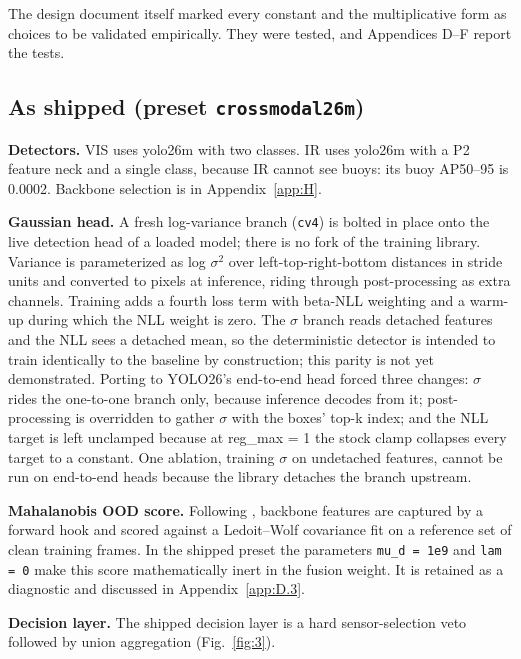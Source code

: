 \documentclass[journal,onecolumn]{IEEEtran}
\begin{document}
The design document itself marked every constant and the multiplicative form as choices to be validated empirically. They were tested, and Appendices D--F report the tests.

\subsection{As shipped (preset \texttt{crossmodal26m})}\label{app:D.2}
\textbf{Detectors.} VIS uses yolo26m \cite{jocher2026ultralytics} with two classes. IR uses yolo26m with a P2 feature neck and a single class, because IR cannot see buoys: its buoy AP50--95 is 0.0002. Backbone selection is in Appendix~\ref{app:H}.

\textbf{Gaussian head.} A fresh log-variance branch (\texttt{cv4}) is bolted in place onto the live detection head of a loaded model; there is no fork of the training library. Variance is parameterized as log $\sigma$$^{2}$ over left-top-right-bottom distances in stride units and converted to pixels at inference, riding through post-processing as extra channels. Training adds a fourth loss term with beta-NLL weighting \cite{seitzer2022on} and a warm-up during which the NLL weight is zero. The $\sigma$ branch reads detached features and the NLL sees a detached mean, so the deterministic detector is intended to train identically to the baseline by construction; this parity is not yet demonstrated. Porting to YOLO26's end-to-end head forced three changes: $\sigma$ rides the one-to-one branch only, because inference decodes from it; post-processing is overridden to gather $\sigma$ with the boxes' top-k index; and the NLL target is left unclamped because at reg\_max = 1 the stock clamp collapses every target to a constant. One ablation, training $\sigma$ on undetached features, cannot be run on end-to-end heads because the library detaches the branch upstream.

\textbf{Mahalanobis OOD score.} Following \citet{lee2018a}, backbone features are captured by a forward hook and scored against a Ledoit--Wolf covariance \cite{ledoit2004a} fit on a reference set of clean training frames. In the shipped preset the parameters \texttt{mu\_\allowbreak{}d = 1e9} and \texttt{lam = 0} make this score mathematically inert in the fusion weight. It is retained as a diagnostic and discussed in Appendix~\ref{app:D.3}.

\textbf{Decision layer.} The shipped decision layer is a hard sensor-selection veto followed by union aggregation (Fig.~\ref{fig:3}).
\end{document}
